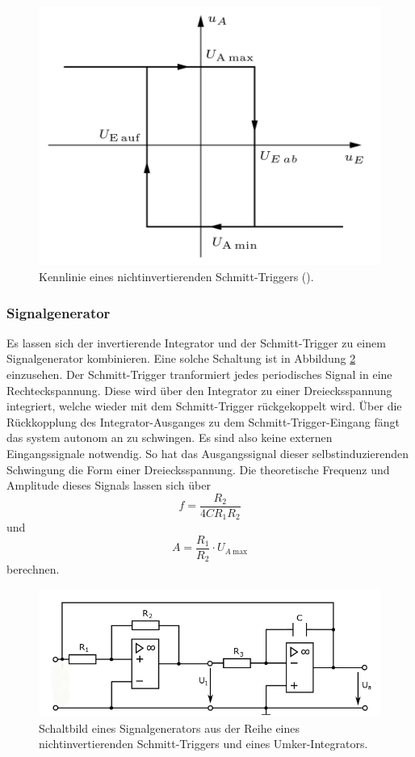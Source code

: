 \begin{figure}
    \centering 
    \includegraphics[width=.5\textwidth]{Bilder/Kenn_Schmitt.PNG}
    \caption{Kennlinie eines nichtinvertierenden Schmitt-Triggers (\cite[S.~115]{Clausert}).}
    \label{fig:Kenn_Schmitt}
\end{figure}

\subsubsection{Signalgenerator}
Es lassen sich der invertierende Integrator und der Schmitt-Trigger zu einem Signalgenerator kombinieren.
Eine solche Schaltung ist in Abbildung \ref{fig:Signal} einzusehen.
Der Schmitt-Trigger tranformiert jedes periodisches Signal in eine Rechteckspannung.
Diese wird über den Integrator zu einer Dreiecksspannung integriert, welche wieder mit dem Schmitt-Trigger rückgekoppelt wird.
Über die Rückkopplung des Integrator-Ausganges zu dem Schmitt-Trigger-Eingang fängt das system autonom an zu schwingen.
Es sind also keine externen Eingangssignale notwendig.
So hat das Ausgangssignal dieser selbstinduzierenden Schwingung die Form einer Dreiecksspannung.
Die theoretische Frequenz und Amplitude dieses Signals lassen sich über
\begin{equation}
    f = \frac{R_2}{4CR_1R_2}
\end{equation}
und 
\begin{equation}
    A = \frac{R_1}{R_2}\cdot U_{A \: \text{max}}
\end{equation}
berechnen.

\begin{figure}
    \centering 
    \includegraphics[width=.9\textwidth]{Bilder/Signal.png}
    \caption{Schaltbild eines Signalgenerators aus der Reihe eines nichtinvertierenden Schmitt-Triggers und eines Umker-Integrators.}
    \label{fig:Signal}
\end{figure}



